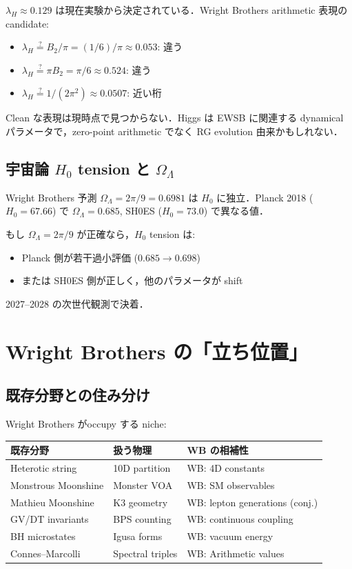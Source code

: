 \documentclass[11pt,a4paper]{article}
\begin{document}
$\lambda_H \approx 0.129$ は現在実験から決定されている．Wright Brothers
arithmetic 表現の candidate:
\begin{itemize}
\item $\lambda_H \stackrel{?}{=} B_2/\pi = (1/6)/\pi \approx 0.053$: 違う
\item $\lambda_H \stackrel{?}{=} \pi B_2 = \pi/6 \approx 0.524$: 違う
\item $\lambda_H \stackrel{?}{=} 1/(2\pi^2) \approx 0.0507$: 近い桁
\end{itemize}

Clean な表現は現時点で見つからない．Higgs は EWSB に関連する
dynamical パラメータで，zero-point arithmetic でなく RG evolution
由来かもしれない．

\subsection{宇宙論 $H_0$ tension と $\Omega_\Lambda$}

Wright Brothers 予測 $\Omega_\Lambda = 2\pi/9 = 0.6981$ は
$H_0$ に独立．Planck 2018 ($H_0 = 67.66$) で $\Omega_\Lambda = 0.685$,
SH0ES ($H_0 = 73.0$) で異なる値．

もし $\Omega_\Lambda = 2\pi/9$ が正確なら，$H_0$ tension は:
\begin{itemize}
\item Planck 側が若干過小評価 ($0.685 \to 0.698$)
\item または SH0ES 側が正しく，他のパラメータが shift
\end{itemize}

2027--2028 の次世代観測で決着．

\section{Wright Brothers の「立ち位置」}

\subsection{既存分野との住み分け}

Wright Brothers がoccupy する niche:

\begin{center}
\begin{tabular}{lll}
\toprule
既存分野 & 扱う物理 & WB の相補性 \\
\midrule
Heterotic string & 10D partition & WB: 4D constants \\
Monstrous Moonshine & Monster VOA & WB: SM observables \\
Mathieu Moonshine & K3 geometry & WB: lepton generations (conj.)\\
GV/DT invariants & BPS counting & WB: continuous coupling \\
BH microstates & Igusa forms & WB: vacuum energy \\
Connes--Marcolli & Spectral triples & WB: Arithmetic values \\
\bottomrule
\end{tabular}
\end{center}
\end{document}
